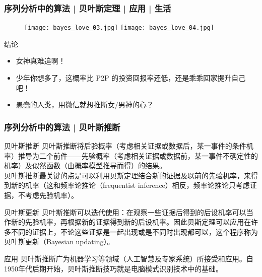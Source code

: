 \begin{frame}
  \frametitle{序列分析中的算法 | 贝叶斯定理 | 应用 | 生活}
  \begin{figure}
    \centering
    \texttt{[image: bayes\_love\_03.jpg]}
    \texttt{[image: bayes\_love\_04.jpg]}
  \end{figure}
  \pause
  \vspace{-2em}
  \begin{block}{结论}
    \begin{itemize}
      \item 女神真难追啊！
      \item 少年你想多了，这概率比 P2P 的投资回报率还低，还是乖乖回家提升自己吧！
      \item 愚蠢的人类，用微信就想推断女/男神的心？
    \end{itemize}
  \end{block}
\end{frame}

\begin{frame}
  \frametitle{序列分析中的算法 | 贝叶斯推断}
  \vspace{-0.4em}
  \begin{block}{贝叶斯推断}
    {\small 贝叶斯推断将后验概率（考虑相关证据或数据后，某一事件的条件机率）推导为二个前件——先验概率（考虑相关证据或数据前，某一事件不确定性的机率）及似然函数（由概率模型推导而得）的结果。\\
\vspace{0.1em}
    贝叶斯推断最关键的点是可以利用贝斯定理结合新的证据及以前的先验机率，来得到新的机率（这和频率论推论（frequentist inference）相反，频率论推论只考虑证据，不考虑先验机率）。
  }
  \end{block}
  \pause
  \vspace{-0.4em}
  \begin{block}{贝叶斯更新}
    {\small
贝叶斯推断可以迭代使用：在观察一些证据后得到的后设机率可以当作新的先验机率，再根据新的证据得到新的后设机率。因此贝斯定理可以应用在许多不同的证据上，不论这些证据是一起出现或是不同时出现都可以，这个程序称为贝叶斯更新（Bayesian updating）。
}
  \end{block}
  \pause
  \vspace{-0.4em}
  \begin{block}{应用}
    {\small
    贝叶斯推断广为机器学习等领域（人工智慧及专家系统）所接受和应用。自1950年代后期开始，贝叶斯推断技巧就是电脑模式识别技术中的基础。
  } 
  \end{block}
\end{frame}

